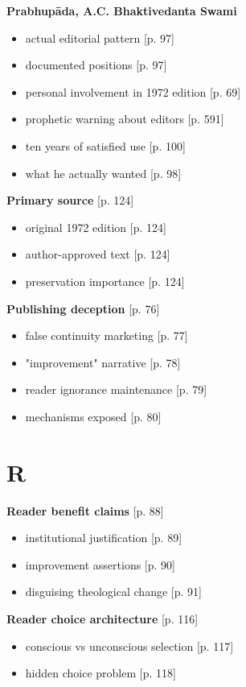 \documentclass[11pt,twoside]{book}
\begin{document}
\textbf{\textbf{Prabhupāda, A.C. Bhaktivedanta Swami}}
\begin{itemize}
\item actual editorial pattern [p. 97]
\item documented positions [p. 97]
\item personal involvement in 1972 edition [p. 69]
\item prophetic warning about editors [p. 591]
\item ten years of satisfied use [p. 100]
\item what he actually wanted [p. 98]
\end{itemize}

\textbf{\textbf{Primary source}} {[}p. 124]
\begin{itemize}
\item original 1972 edition [p. 124]
\item author-approved text [p. 124]
\item preservation importance [p. 124]
\end{itemize}

\textbf{\textbf{Publishing deception}} {[}p. 76]
\begin{itemize}
\item false continuity marketing [p. 77]
\item "improvement" narrative [p. 78]
\item reader ignorance maintenance [p. 79]
\item mechanisms exposed [p. 80]
\end{itemize}
\section*{R}
\label{sec:org04b9e67}

\textbf{\textbf{Reader benefit claims}} {[}p. 88]
\begin{itemize}
\item institutional justification [p. 89]
\item improvement assertions [p. 90]
\item disguising theological change [p. 91]
\end{itemize}

\textbf{\textbf{Reader choice architecture}} {[}p. 116]
\begin{itemize}
\item conscious vs unconscious selection [p. 117]
\item hidden choice problem [p. 118]
\end{itemize}
\end{document}
